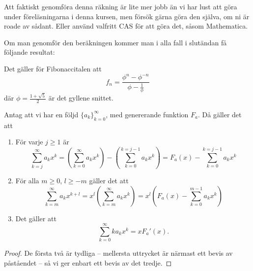 \documentclass[nobib]{tufte-handout}
\begin{document}
Att faktiskt genomföra denna räkning är lite mer jobb än vi har lust att göra under föreläsningarna i denna kursen, men försök gärna göra den själva, om ni är roade av sådant. Eller använd valfritt CAS för att göra det, såsom Mathematica.

Om man genomför den beräkningen kommer man i alla fall i slutändan få följande resultat:

\begin{proposition}
    Det gäller för Fibonaccitalen att
    $$f_n = \frac{\phi^n - \phi^{-n}}{\phi - \frac{1}{\phi}}$$
    där $\phi = \frac{1 + \sqrt{5}}{2}$ är det gyllene snittet.
\end{proposition}

\begin{lemma}\label{lemma_generating_function_calc_rules}
    Antag att vi har en följd $\{a_k\}_{k=0}^\infty$, med genererande funktion $F_a$. Då gäller det att
    \begin{enumerate}
        \item För varje $j \geq 1$ är
        $$\sum_{k = j}^{\infty} a_k x^k = \left(\sum_{k=0}^{\infty}a_k x^k\right) - \left(\sum_{k=0}^{k=j-1} a_kx^k\right) = F_a(x) - \sum_{k=0}^{k=j-1} a_kx^k$$
        \item För alla $m \geq 0$, $l \geq -m$ gäller det att
        $$\sum_{k=m}^{\infty} a_k x^{k + l} = x^l\left(\sum_{k=m}^{\infty} a_k x^{k}\right) = x^l\left(F_a(x) - \sum_{k=0}^{m-1} a_k x^k\right)$$
        \item Det gäller att
        $$\sum_{k=0}^{\infty} k a_k x^k = x F_a'(x).$$
        
    \end{enumerate}
    \begin{proof}
        De första två är tydliga -- mellersta uttrycket är närmast ett bevis av påståendet -- så vi ger enbart ett bevis av det tredje.


\end{proof}
\end{lemma}
\end{document}
